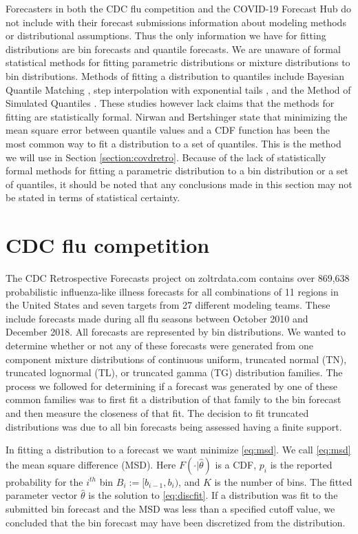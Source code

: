 \documentclass[11pt,notitlepage]{isuthesis}
\begin{document}
Forecasters in both the CDC flu competition and the COVID-19 Forecast Hub do 
not include with their forecast submissions information about modeling methods 
or 
distributional assumptions. Thus the only information we have for fitting
distributions are bin
forecasts and quantile forecasts. We are unaware of formal statistical 
methods for fitting parametric distributions or mixture distributions to bin
distributions. Methods of fitting a distribution to quantiles 
include Bayesian Quantile Matching
\cite[]{nirwan2020bayesian}, step interpolation with exponential tails 
\cite[]{quinonero2005evaluating},
and the Method of Simulated Quantiles 
\cite[]{dominicy2013method}. These studies however lack claims that the methods
for fitting are statistically formal.
Nirwan and Bertshinger state that minimizing the mean square error between 
quantile values and a CDF function has been the most common way to fit a 
distribution
to a set of quantiles. This is the method we will use in Section 
\ref{section:covdretro}.
Because of the lack of statistically formal methods for fitting a parametric
distribution to a bin distribution or a set of quantiles, 
it should be noted that any conclusions made in 
this section may not be 
stated in terms of statistical certainty.



\section{CDC flu competition}
The CDC Retrospective Forecasts project on zoltrdata.com \cite[]{zoltarflu} 
contains over
869,638 probabilistic influenza-like illness forecasts for all combinations
of 11 regions 
in the United States and seven targets from 27 different modeling teams. These
include forecasts made during all flu seasons between October 2010 and December
2018. All forecasts are represented by bin distributions. 
We wanted to determine whether or not any of these forecasts were
generated from one component mixture distributions of continuous uniform, 
truncated normal (TN), truncated
lognormal (TL), or truncated gamma (TG) distribution families.
The process we followed for determining if a forecast was generated by one of
these common families was to first fit a distribution of that family to the bin
forecast and then measure the closeness of that fit. The decision to 
fit truncated 
distributions was due to all bin forecasts being assessed having a finite 
support.

In fitting a distribution to a forecast we want minimize \eqref{eq:msd}. We call
\eqref{eq:msd} the mean square difference (MSD).
Here $F(\cdot| \hat{\theta})$ is a CDF, $p_i$ is the reported probability for 
the $i^{th}$ bin $B_i := [b_{i-1}, b_i)$, and $K$ is the number of bins.
The fitted parameter vector $\hat{\theta}$ is the solution to 
\eqref{eq:discfit}.
If a distribution was fit to the submitted bin forecast
and the MSD was less than a 
specified cutoff value, we
concluded that the bin forecast may have been discretized from the 
distribution.
\end{document}
